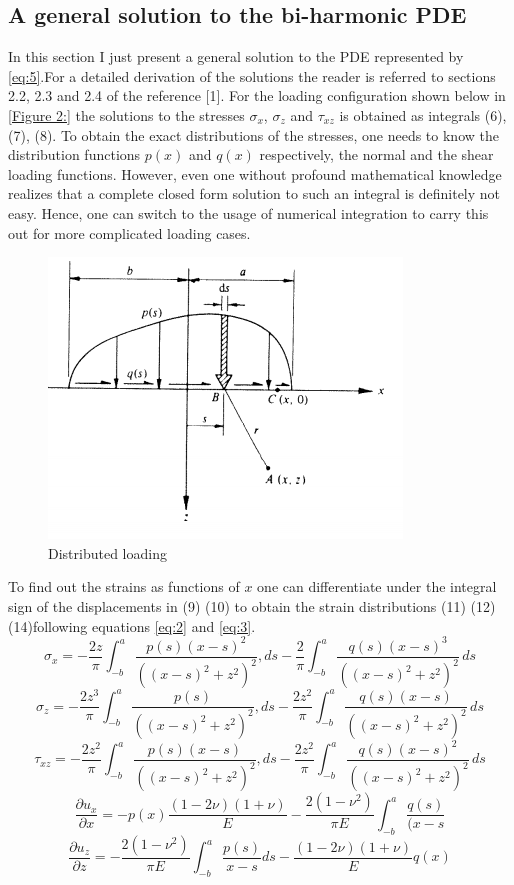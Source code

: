 \documentclass{article}
\begin{document}
\subsection{A general solution to the bi-harmonic PDE}
In this section I just present a general solution to the PDE represented by \eqref{eq:5}.For a detailed derivation of the solutions the reader is referred to sections 2.2, 2.3 and 2.4 of the reference [1]. For the loading configuration shown below in \eqref{Figure 2:} the solutions to the stresses $\sigma_x$, $\sigma_z$ and $\tau_{xz}$ is obtained as integrals (6), (7), (8). To obtain the exact distributions of the stresses, one needs to know the distribution functions $p(x)$ and $q(x)$ respectively, the normal and the shear loading functions. However, even one without profound mathematical knowledge realizes that a complete closed form solution to such an integral is definitely not easy. Hence, one can switch to the usage of numerical integration to carry this out for more complicated loading cases. 
\begin{figure}[h]
 \centering
 \includegraphics{distributed}
 \caption{Distributed loading}
 \label{Figure 2:}
\end{figure}  
To find out the strains as functions of $x$ one can differentiate under the integral sign of the displacements in (9) (10) to obtain the strain distributions (11) (12) (14)following equations \eqref{eq:2} and \eqref{eq:3}. 
\[
\sigma_x = -\frac{2z}{\pi}\int_{-b}^{a}\frac{p(s)(x-s)^2}{((x-s)^2+z^2)^2},ds - \frac{2}{\pi}\int_{-b}^{a}\frac{q(s)(x-s)^3}{((x-s)^2+z^2)^2}\,ds \tag{6} \label{eq:6}
\]
\[
\sigma_z = -\frac{2z^3}{\pi}\int_{-b}^{a}\frac{p(s)}{((x-s)^2+z^2)^2},ds - \frac{2z^2}{\pi}\int_{-b}^{a}\frac{q(s)(x-s)}{((x-s)^2+z^2)^2}\,ds \tag{7} \label{eq:7}
\]
\[
\tau_{xz} = -\frac{2z^2}{\pi}\int_{-b}^{a}\frac{p(s)(x-s)}{((x-s)^2+z^2)^2},ds - \frac{2z^2}{\pi}\int_{-b}^{a}\frac{q(s)(x-s)^2}{((x-s)^2+z^2)^2}\,ds \tag{8} \label{eq:8}
\]
\[
\frac{\partial u_x}{\partial x} = -p(x)\frac{(1-2\nu)(1+\nu)}{E}-\frac{2(1-\nu^2)}{\pi E} \int_{-b}^{a}\frac{q(s)}{(x-s} \tag{9} \label{eq:9}
\]
\[
\frac{\partial u_z}{\partial z} = -\frac{2(1-\nu^2)}{\pi E}{\int_{-b}^{a}\frac{p(s)}{x-s}ds}-\frac{(1-2\nu)(1+\nu)}{E}q(x) \tag{10} \label{eq:10}
\]
\end{document}
